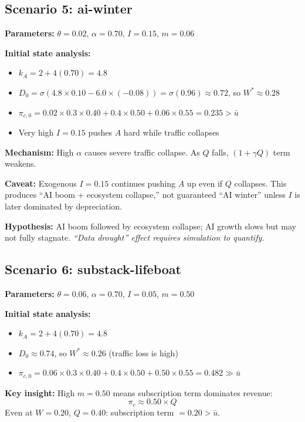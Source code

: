 \documentclass[11pt]{article}
\begin{document}
\subsection{Scenario 5: ai-winter}
\textbf{Parameters:} $\theta=0.02$, $\alpha=0.70$, $I=0.15$, $m=0.06$

\textbf{Initial state analysis:}
\begin{itemize}
    \item $k_A = 2 + 4(0.70) = 4.8$
    \item $D_0 = \sigma(4.8 \times 0.10 - 6.0 \times (-0.08)) = \sigma(0.96) \approx 0.72$, so $W^* \approx 0.28$
    \item $\pi_{c,0} = 0.02 \times 0.3 \times 0.40 + 0.4 \times 0.50 + 0.06 \times 0.55 = 0.235 > \bar{u}$
    \item Very high $I=0.15$ pushes $A$ hard while traffic collapses
\end{itemize}

\textbf{Mechanism:} High $\alpha$ causes severe traffic collapse. As $Q$ falls, $(1+\gamma Q)$ term weakens.

\textbf{Caveat:} Exogenous $I=0.15$ continues pushing $A$ up even if $Q$ collapses. This produces ``AI boom + ecosystem collapse,'' not guaranteed ``AI winter'' unless $I$ is later dominated by depreciation.

\textcolor{myorange}{\textbf{Hypothesis:}} AI boom followed by ecosystem collapse; AI growth slows but may not fully stagnate. \textit{``Data drought'' effect requires simulation to quantify.}

\subsection{Scenario 6: substack-lifeboat}
\textbf{Parameters:} $\theta=0.06$, $\alpha=0.70$, $I=0.05$, $m=0.50$

\textbf{Initial state analysis:}
\begin{itemize}
    \item $k_A = 2 + 4(0.70) = 4.8$
    \item $D_0 \approx 0.74$, so $W^* \approx 0.26$ (traffic loss is high)
    \item $\pi_{c,0} = 0.06 \times 0.3 \times 0.40 + 0.4 \times 0.50 + 0.50 \times 0.55 = 0.482 \gg \bar{u}$
\end{itemize}

\textbf{Key insight:} High $m=0.50$ means subscription term dominates revenue:
\[
\pi_c \approx 0.50 \times Q
\]
Even at $W=0.20$, $Q=0.40$: subscription term $= 0.20 > \bar{u}$.
\end{document}
